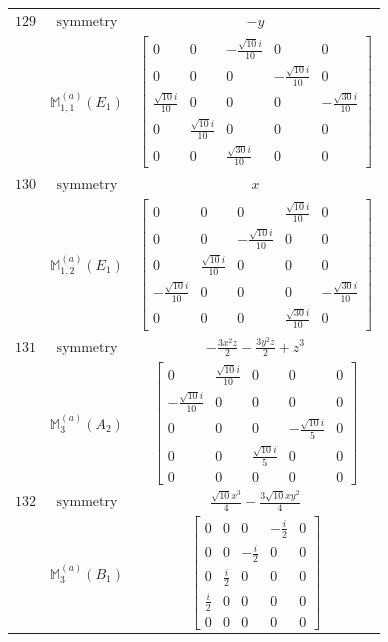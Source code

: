 \documentclass[fleqn,8pt,landscape]{jsarticle}
\begin{document}
\begin{longtable}{ccc}
$ 129 $ & $ \text{symmetry} $ & $ - y $ \\
$  $ & $ \mathbb{M}_{1,1}^{(a)}(E_{1}) $ & $ \begin{bmatrix} 0 & 0 & - \frac{\sqrt{10} i}{10} & 0 & 0 \\ 0 & 0 & 0 & - \frac{\sqrt{10} i}{10} & 0 \\ \frac{\sqrt{10} i}{10} & 0 & 0 & 0 & - \frac{\sqrt{30} i}{10} \\ 0 & \frac{\sqrt{10} i}{10} & 0 & 0 & 0 \\ 0 & 0 & \frac{\sqrt{30} i}{10} & 0 & 0 \end{bmatrix} $ \\ \hline
$ 130 $ & $ \text{symmetry} $ & $ x $ \\
$  $ & $ \mathbb{M}_{1,2}^{(a)}(E_{1}) $ & $ \begin{bmatrix} 0 & 0 & 0 & \frac{\sqrt{10} i}{10} & 0 \\ 0 & 0 & - \frac{\sqrt{10} i}{10} & 0 & 0 \\ 0 & \frac{\sqrt{10} i}{10} & 0 & 0 & 0 \\ - \frac{\sqrt{10} i}{10} & 0 & 0 & 0 & - \frac{\sqrt{30} i}{10} \\ 0 & 0 & 0 & \frac{\sqrt{30} i}{10} & 0 \end{bmatrix} $ \\ \hline
$ 131 $ & $ \text{symmetry} $ & $ - \frac{3 x^{2} z}{2} - \frac{3 y^{2} z}{2} + z^{3} $ \\
$  $ & $ \mathbb{M}_{3}^{(a)}(A_{2}) $ & $ \begin{bmatrix} 0 & \frac{\sqrt{10} i}{10} & 0 & 0 & 0 \\ - \frac{\sqrt{10} i}{10} & 0 & 0 & 0 & 0 \\ 0 & 0 & 0 & - \frac{\sqrt{10} i}{5} & 0 \\ 0 & 0 & \frac{\sqrt{10} i}{5} & 0 & 0 \\ 0 & 0 & 0 & 0 & 0 \end{bmatrix} $ \\ \hline
$ 132 $ & $ \text{symmetry} $ & $ \frac{\sqrt{10} x^{3}}{4} - \frac{3 \sqrt{10} x y^{2}}{4} $ \\
$  $ & $ \mathbb{M}_{3}^{(a)}(B_{1}) $ & $ \begin{bmatrix} 0 & 0 & 0 & - \frac{i}{2} & 0 \\ 0 & 0 & - \frac{i}{2} & 0 & 0 \\ 0 & \frac{i}{2} & 0 & 0 & 0 \\ \frac{i}{2} & 0 & 0 & 0 & 0 \\ 0 & 0 & 0 & 0 & 0 \end{bmatrix} $ \\ \hline

\end{longtable}
\end{document}
